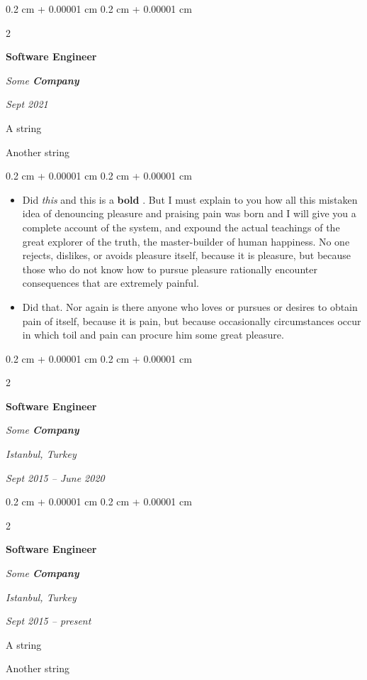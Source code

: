 \documentclass[10pt, letterpaper]{article}
\newenvironment{summary}{
    \begin{description}[
        topsep=0.10 cm,
        parsep=0.10 cm,
        partopsep=0pt,
        itemsep=0pt,
        leftmargin=0.4 cm + 10pt
    ]
}{
    \end{description}
} %
\newenvironment{highlights}{
    \begin{itemize}[
        topsep=0.10 cm,
        parsep=0.10 cm,
        partopsep=0pt,
        itemsep=0pt,
        leftmargin=0.4 cm + 10pt
    ]
}{
    \end{itemize}
} %
\newenvironment{onecolentry}{
    \begin{adjustwidth}{
        0.2 cm + 0.00001 cm
    }{
        0.2 cm + 0.00001 cm
    }
}{
    \end{adjustwidth}
} %
\newenvironment{twocolentry}[2][]{
    \onecolentry
    \def\secondColumn{#2}
    \setcolumnwidth{\fill, 4.5 cm}
    \begin{paracol}{2}
}{
    \switchcolumn \raggedleft \secondColumn
    \end{paracol}
    \endonecolentry
} %
\let\hrefWithoutArrow\href
\renewcommand{\href}[2]{\hrefWithoutArrow{#1}{\ifthenelse{\equal{#2}{}}{ }{#2 }\raisebox{.15ex}{\footnotesize \faExternalLink*}}}
\begin{document}
        \begin{twocolentry}{
            
            
        \textit{Sept 2021}}
            \textbf{Software Engineer}
            
            \textit{Some \textbf{Company}}
        \end{twocolentry}
            \begin{summary}
                \item A string
                \item Another string
            \end{summary}
        \vspace{0.10 cm}
        \begin{onecolentry}
            \begin{highlights}
                \item Did \textit{this} and this is a \textbf{bold} \href{https://example.com}{link}. But I must explain to you how all this mistaken idea of denouncing pleasure and praising pain was born and I will give you a complete account of the system, and expound the actual teachings of the great explorer of the truth, the master-builder of human happiness. No one rejects, dislikes, or avoids pleasure itself, because it is pleasure, but because those who do not know how to pursue pleasure rationally encounter consequences that are extremely painful.
                \item Did that. Nor again is there anyone who loves or pursues or desires to obtain pain of itself, because it is pain, but because occasionally circumstances occur in which toil and pain can procure him some great pleasure.
            \end{highlights}
        \end{onecolentry}


        \vspace{0.2 cm}

        \begin{twocolentry}{
        \textit{Istanbul, Turkey}    
            
        \textit{Sept 2015 – June 2020}}
            \textbf{Software Engineer}
            
            \textit{Some \textbf{Company}}
        \end{twocolentry}


        \vspace{0.2 cm}

        \begin{twocolentry}{
        \textit{Istanbul, Turkey}    
            
        \textit{Sept 2015 – present}}
            \textbf{Software Engineer}
            
            \textit{Some \textbf{Company}}
        \end{twocolentry}
            \begin{summary}
                \item A string
                \item Another string
            \end{summary}
\end{document}
